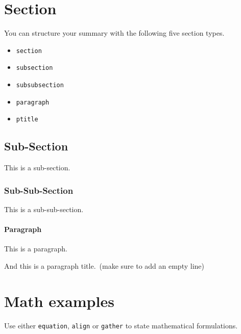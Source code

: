 \documentclass[\fontheight]{extarticle}
\begin{document}
\begin{multicols*}{3}



    \section{Section}
    You can structure your summary with the following five section types.
    \begin{itemize}
        \item \texttt{section}
        \item \texttt{subsection}
        \item \texttt{subsubsection}
        \item \texttt{paragraph}
        \item \texttt{ptitle}
    \end{itemize}

    \subsection{Sub-Section}
    This is a sub-section.

    \subsubsection{Sub-Sub-Section}
    This is a sub-sub-section.

    \paragraph{Paragraph}
    This is a paragraph.


    And this is a paragraph title.\ (make sure to add an empty line)

    \section{Math examples}

    Use either \texttt{equation}, \texttt{align} or \texttt{gather} to
    state mathematical formulations.


\end{multicols*}
\end{document}
